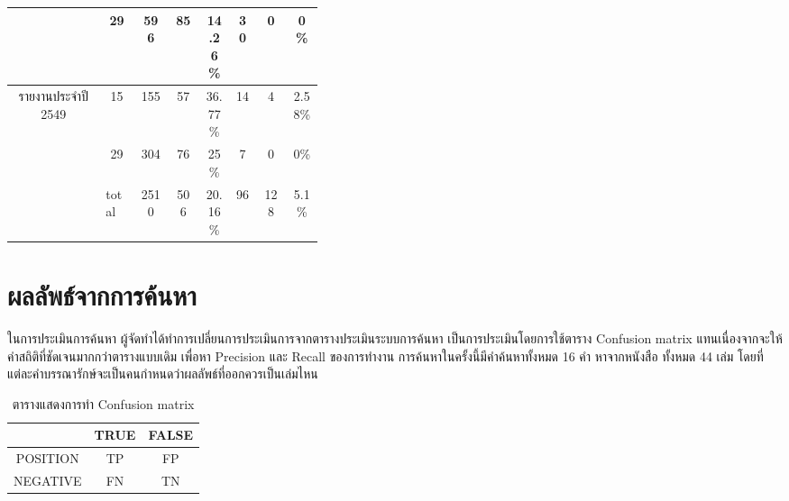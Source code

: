 \begin{table}[H]
\begin{tabular}{|c|c|c|p{0.1\linewidth}|p{0.1\linewidth}|c|p{0.1\linewidth}|p{0.1\linewidth}|}
                                            & 29                         & \multicolumn{1}{c|}{596 }      & \multicolumn{1}{c|}{85 }         & \multicolumn{1}{c|}{14.26\%} & \multicolumn{1}{c|}{30}     & \multicolumn{1}{c|}{0  }             & \multicolumn{1}{c|}{0\%    } \\ \hline
        \multirow{2}{*}{รายงานประจำปี 2549} & 15                           & \multicolumn{1}{c|}{155 }      & \multicolumn{1}{c|}{57 }         & \multicolumn{1}{c|}{36.77\%} & \multicolumn{1}{c|}{14}     & \multicolumn{1}{c|}{4  }             & \multicolumn{1}{c|}{2.58\% } \\ \cline{2-8} 
                                            & 29                         & \multicolumn{1}{c|}{304 }      & \multicolumn{1}{c|}{76 }         & \multicolumn{1}{c|}{25\%   } & \multicolumn{1}{c|}{7 }     & \multicolumn{1}{c|}{0  }             & \multicolumn{1}{c|}{0\%    } \\ \hline
        \multicolumn{1}{|l|}{}              & \multicolumn{1}{l|}{total} & \multicolumn{1}{c|}{2510}      & \multicolumn{1}{c|}{506}         & \multicolumn{1}{c|}{20.16\%} & \multicolumn{1}{c|}{96}     & \multicolumn{1}{c|}{128}             & \multicolumn{1}{c|}{5.1\%  } \\ \hline
        \end{tabular}
        \end{table}

\section{ผลลัพธ์จากการค้นหา}
ในการประเมินการค้นหา ผู้จัดทำได้ทำการเปลี่ยนการประเมินการจากตารางประเมินระบบการค้นหา เป็นการประเมินโดยการใช้ตาราง Confusion matrix แทนเนื่องจากจะให้ค่าสถิติที่ชัดเจนมากกว่าตารางแบบเดิม
เพื่อหา Precision และ Recall ของการทำงาน การค้นหาในครั้งนี้มีคำค้นหาทั้งหมด 
16 คำ หาจากหนังสือ ทั้งหมด 44 เล่ม โดยที่แต่ละคำบรรณารักษ์จะเป็นคนกำหนดว่าผลลัพธ์ที่ออกควรเป็นเล่มไหน 

\begin{table}[H]
    \caption{ตารางแสดงการทำ Confusion matrix}\label{tbl:evasearch}
    \begin{tabular}{|c|c|c|}
    \hline
             & TRUE & FALSE \\ \hline
    POSITION & TP   & FP   \\ \hline
    NEGATIVE & FN   & TN   \\ \hline
    \end{tabular}
    \end{table}

